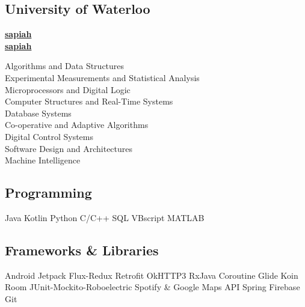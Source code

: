 \documentclass[a4paper]{MagicalCV}
\begin{document}

\begin{minipage}[t]{0.33\textwidth} 


\subsection{University of Waterloo}
\vspace{\topsep} %
\sectionsep


 \href{https://github.com/sapiah}{\bf sapiah} \\
 \href{https://www.linkedin.com/in/sapiah/}{\bf sapiah}
\sectionsep


Algorithms and Data Structures \\
Experimental Measurements and Statistical Analysis \\
Microprocessors and Digital Logic \\
Computer Structures and Real-Time Systems \\
Database Systems \\
Co-operative and Adaptive Algorithms \\
Digital Control Systems \\ 
Software Design and Architectures \\
Machine Intelligence \\ 
\sectionsep


\subsection{Programming}
Java \textbullet{}   Kotlin \textbullet{} Python \textbullet{} C/C++ \textbullet{} SQL  \textbullet{}
VBscript \textbullet{} MATLAB 
\sectionsep
\subsection{Frameworks \& Libraries}
Android Jetpack \textbullet{} Flux-Redux \textbullet{} Retrofit \textbullet{} OkHTTP3 \textbullet{} RxJava \textbullet{} Coroutine\textbullet{} Glide \textbullet{} Koin\textbullet{} Room \textbullet{} JUnit-Mockito-Roboelectric \textbullet{} Spotify \& Google Maps API  \textbullet{} Spring \textbullet{} Firebase \textbullet{} Git
\sectionsep


\end{minipage}
\end{document}
